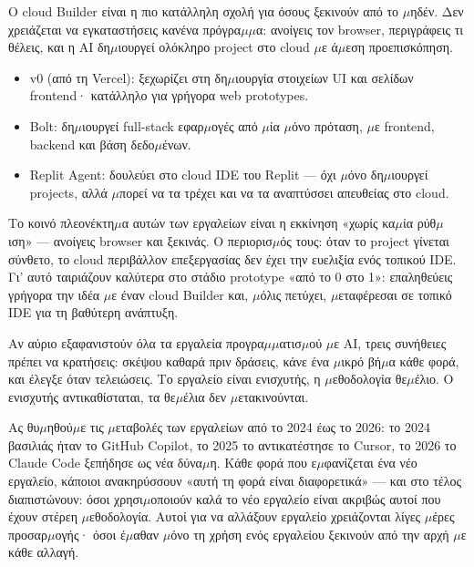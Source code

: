 
Ο cloud Builder είναι η πιο κατάλληλη σχολή για όσους ξεκινούν από το $\mu$ηδέν. Δεν χρειάζεται να εγκαταστήσεις κανένα πρόγρα$\mu$$\mu$α: ανοίγεις τον browser, περιγράφεις τι θέλεις, και η AI δη$\mu$ιουργεί ολόκληρο project στο cloud $\mu$ε ά$\mu$εση προεπισκόπηση.

\begin{itemize}
  \item v0 (από τη Vercel): ξεχωρίζει στη δη$\mu$ιουργία στοιχείων UI και σελίδων frontend· κατάλληλο για γρήγορα web prototypes.
  \item Bolt: δη$\mu$ιουργεί full-stack εφαρ$\mu$ογές από $\mu$ία $\mu$όνο πρόταση, $\mu$ε frontend, backend και βάση δεδο$\mu$ένων.
  \item Replit Agent: δουλεύει στο cloud IDE του Replit — όχι $\mu$όνο δη$\mu$ιουργεί projects, αλλά $\mu$πορεί να τα τρέχει και να τα αναπτύσσει απευθείας στο cloud.
\end{itemize}

Το κοινό πλεονέκτη$\mu$α αυτών των εργαλείων είναι η εκκίνηση «χωρίς κα$\mu$ία ρύθ$\mu$ιση» — ανοίγεις browser και ξεκινάς. Ο περιορισ$\mu$ός τους: όταν το project γίνεται σύνθετο, το cloud περιβάλλον επεξεργασίας δεν έχει την ευελιξία ενός τοπικού IDE. Γι' αυτό ταιριάζουν καλύτερα στο στάδιο prototype «από το 0 στο 1»: επαληθεύεις γρήγορα την ιδέα $\mu$ε έναν cloud Builder και, $\mu$όλις πετύχει, $\mu$εταφέρεσαι σε τοπικό IDE για τη βαθύτερη ανάπτυξη.


Αν αύριο εξαφανιστούν όλα τα εργαλεία προγρα$\mu$$\mu$ατισ$\mu$ού $\mu$ε AI, τρεις συνήθειες πρέπει να κρατήσεις: σκέψου καθαρά πριν δράσεις, κάνε ένα $\mu$ικρό βή$\mu$α κάθε φορά, και έλεγξε όταν τελειώσεις. Το εργαλείο είναι ενισχυτής, η $\mu$εθοδολογία θε$\mu$έλιο. Ο ενισχυτής αντικαθίσταται, τα θε$\mu$έλια δεν $\mu$ετακινούνται.

Ας θυ$\mu$ηθού$\mu$ε τις $\mu$εταβολές των εργαλείων από το 2024 έως το 2026: το 2024 βασιλιάς ήταν το GitHub Copilot, το 2025 το αντικατέστησε το Cursor, το 2026 το Claude Code ξεπήδησε ως νέα δύνα$\mu$η. Κάθε φορά που ε$\mu$φανίζεται ένα νέο εργαλείο, κάποιοι ανακηρύσσουν «αυτή τη φορά είναι διαφορετικά» — και στο τέλος διαπιστώνουν: όσοι χρησι$\mu$οποιούν καλά το νέο εργαλείο είναι ακριβώς αυτοί που έχουν στέρεη $\mu$εθοδολογία. Αυτοί για να αλλάξουν εργαλείο χρειάζονται λίγες $\mu$έρες προσαρ$\mu$ογής· όσοι έ$\mu$αθαν $\mu$όνο τη χρήση ενός εργαλείου ξεκινούν από την αρχή $\mu$ε κάθε αλλαγή.

